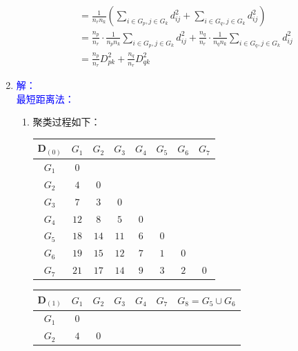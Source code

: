 \begin{enumerate}
\begin{align*}
            &=\frac{1}{n_rn_k}\left(\sum\limits_{i \in G_p,j \in G_k}d_{ij}^2+\sum\limits_{i \in G_q,j \in G_k}d_{ij}^2\right)\\
            &=\frac{n_p}{n_r} \cdot\frac{1}{n_pn_k} \sum\limits_{i \in G_p,j \in G_k}d_{ij}^2+\frac{n_q}{n_r} \cdot\frac{1}{n_qn_k} \sum\limits_{i \in G_q,j \in G_k}d_{ij}^2\\
            &=\frac{n_p}{n_r}D_{pk}^2+\frac{n_q}{n_r}D_{qk}^2
        \end{align*}
        \item
        {\kaishu \textcolor{blue}{解：}}\\
        {\kaishu \textcolor{blue}{最短距离法：}}
        \begin{enumerate}[label=(\arabic*)]
            \item 聚类过程如下：
            \begin{table}[H]
                \centering
                \begin{tabular}{|c|c|c|c|c|c|c|c|}
                    \hline
                    $\pmb{D}_{(0)}$ & $G_1$ & $G_2$ & $G_3$ & $G_4$ & $G_5$ & $G_6$ & $G_7$\\ \hline
                    $G_1$ & $0$ & & & & & & \\ \hline
                    $G_2$ & $4$ & $0$ & & & & & \\ \hline
                    $G_3$ & $7$ & $3$ & $0$ & & & & \\ \hline
                    $G_4$ & $12$ & $8$ & $5$ & $0$ & & & \\ \hline
                    $G_5$ & $18$ & $14$ & $11$ & $6$ & $0$ & & \\ \hline
                    $G_6$ & $19$ & $15$ & $12$ & $7$ & $\textit{1}$ & $0$ & \\ \hline
                    $G_7$ & $21$ & $17$ & $14$ & $9$ & $3$ & $2$ & $0$ \\ \hline
                \end{tabular}
            \end{table}
            \begin{table}[H]
                \centering
                \begin{tabular}{|c|c|c|c|c|c|c|}
                    \hline
                    $\pmb{D}_{(1)}$ & $G_1$ & $G_2$ & $G_3$ & $G_4$ & $G_7$ & $G_8=G_5 \cup G_6$ \\ \hline
                    $G_1$ & $0$ & & & & & \\ \hline
                    $G_2$ & $4$ & $0$ & & & & \\ \hline

\end{tabular}
\end{table}
\end{enumerate}
\end{enumerate}
